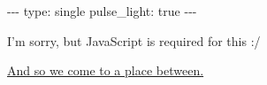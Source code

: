 -\/-\/- type: single pulse\_light: true -\/-\/-

I'm sorry, but JavaScript is required for this :/

\href{/poet-and-mystic/8}{And so we come to a place between.}
